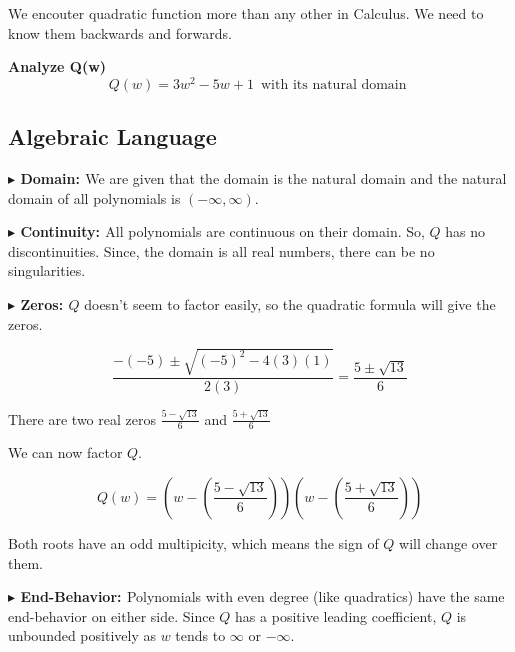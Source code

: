 \documentclass{ximera}
\author{Lee Wayand}
\begin{document}
\begin{exercise}



We encouter quadratic function more than any other in Calculus.  We need to know them backwards and forwards. 


\textbf{Analyze Q(w)} \\

\[
Q(w) = 3 w^2 -5 w + 1 \, \text { with its natural domain } 
\]






\subsection*{Algebraic Language}



\textbf{\textcolor{blue!55!black}{$\blacktriangleright$ Domain: }} We are given that the domain is the natural domain and the natural domain of all polynomials is $(-\infty, \infty)$.


\textbf{\textcolor{blue!55!black}{$\blacktriangleright$ Continuity: }}  All polynomials are continuous on their domain.  So, $Q$ has no discontinuities.  Since, the domain is all real numbers, there can be no singularities.



\textbf{\textcolor{blue!55!black}{$\blacktriangleright$ Zeros: }}  $Q$ doesn't seem to factor easily, so the quadratic formula will give the zeros.


\[
\frac{-(-5) \pm \sqrt{(-5)^2 - 4 (3) (1)}}{2(3)} = \frac{5 \pm \sqrt{13}}{6}
\]


There are two real zeros $\frac{5 - \sqrt{13}}{6}$ and $\frac{5 + \sqrt{13}}{6}$



We can now factor $Q$.

\[
Q(w) = \left(w - \left( \frac{5 - \sqrt{13}}{6} \right) \right) \left(w - \left( \frac{5 + \sqrt{13}}{6} \right) \right)
\]

Both roots have an odd multipicity, which means the sign of $Q$ will change over them.




\textbf{\textcolor{blue!55!black}{$\blacktriangleright$ End-Behavior: }} Polynomials with even degree (like quadratics) have the same end-behavior on either side.  Since $Q$ has a positive leading coefficient, $Q$ is unbounded positively as $w$ tends to $\infty$ or $-\infty$.


\end{exercise}
\end{document}
